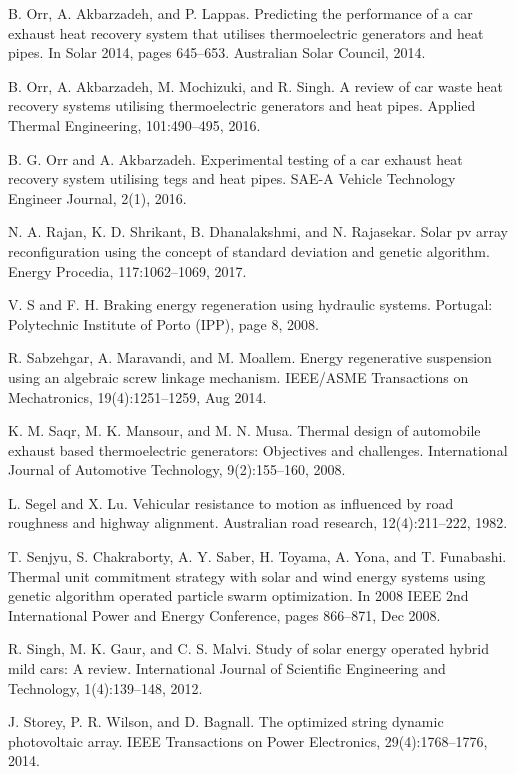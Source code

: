  B. Orr, A. Akbarzadeh, and P. Lappas. Predicting the performance of a car exhaust heat recovery system that utilises thermoelectric generators and heat pipes. In Solar 2014, pages 645--653. Australian Solar Council, 2014.

 B. Orr, A. Akbarzadeh, M. Mochizuki, and R. Singh. A review of car waste heat recovery systems utilising thermoelectric generators and heat pipes. Applied Thermal Engineering, 101:490--495, 2016.

 B. G. Orr and A. Akbarzadeh. Experimental testing of a car exhaust heat recovery system utilising tegs and heat pipes. SAE-A Vehicle Technology Engineer Journal, 2(1), 2016.

 N. A. Rajan, K. D. Shrikant, B. Dhanalakshmi, and N. Rajasekar. Solar pv array reconfiguration using the concept of standard deviation and genetic algorithm. Energy Procedia, 117:1062--1069, 2017.

 V. S and F. H. Braking energy regeneration using hydraulic systems. Portugal: Polytechnic Institute of
Porto (IPP), page 8, 2008.

 R. Sabzehgar, A. Maravandi, and M. Moallem. Energy
regenerative suspension using an algebraic screw linkage mechanism. IEEE/ASME Transactions on Mechatronics, 19(4):1251--1259, Aug 2014.

 K. M. Saqr, M. K. Mansour, and M. N. Musa. Thermal design of automobile exhaust based thermoelectric generators: Objectives and challenges. International Journal of Automotive Technology, 9(2):155--160, 2008.

 L. Segel and X. Lu. Vehicular resistance to motion as influenced by road roughness and highway alignment. Australian road research, 12(4):211--222, 1982.

 T. Senjyu, S. Chakraborty, A. Y. Saber, H. Toyama, A. Yona, and T. Funabashi. Thermal unit commitment strategy with solar and wind energy systems using genetic algorithm operated particle swarm optimization. In 2008 IEEE 2nd International Power and Energy Conference, pages 866--871, Dec 2008.

 R. Singh, M. K. Gaur, and C. S. Malvi. Study of solar energy operated hybrid mild cars: A review. International Journal of Scientific Engineering and Technology, 1(4):139--148, 2012.

 J. Storey, P. R. Wilson, and D. Bagnall. The optimized string dynamic photovoltaic array. IEEE Transactions on Power Electronics, 29(4):1768--1776, 2014.


